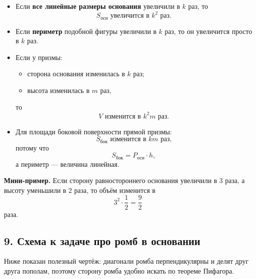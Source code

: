 \documentclass[a4paper,12pt]{article}
\newcommand{\Area}{S}
\newcommand{\Vol}{V}
\newcommand{\per}{P}
\begin{document}
\begin{itemize}
    \item Если \textbf{все линейные размеры основания} увеличили в $k$ раз, то
    \[
    \Area_{\text{осн}}
    \text{ увеличится в } k^2 \text{ раз.}
    \]
    
    \item Если \textbf{периметр} подобной фигуры увеличили в $k$ раз, то он увеличится просто в $k$ раз.
    
    \item Если у призмы:
    \begin{itemize}
        \item сторона основания изменилась в $k$ раз;
        \item высота изменилась в $m$ раз,
    \end{itemize}
    то
    \[
    \Vol \text{ изменится в } k^2m \text{ раз.}
    \]
    
    \item Для площади боковой поверхности прямой призмы:
    \[
    \Area_{\text{бок}} \text{ изменится в } km \text{ раз,}
    \]
    потому что
    \[
    \Area_{\text{бок}}=\per_{\text{осн}}\cdot h,
    \]
    а периметр --- величина линейная.
\end{itemize}

\textbf{Мини-пример.} Если сторону равностороннего основания увеличили в $3$ раза, а высоту уменьшили в $2$ раза, то объём изменится в
\[
3^2\cdot \frac12=\frac92
\]
раза.

\subsection*{9. Схема к задаче про ромб в основании}

Ниже показан полезный чертёж: диагонали ромба перпендикулярны и делят друг друга пополам, поэтому сторону ромба удобно искать по теореме Пифагора.

\begin{center}
\end{center}
\end{document}
